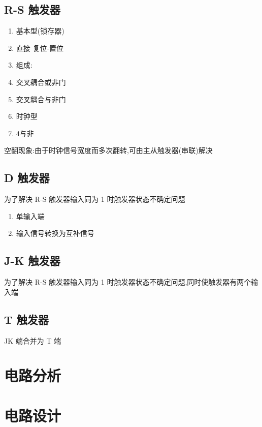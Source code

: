 
\subsection{R-S 触发器}

\begin{enumerate}
    \item 基本型(锁存器)
    \item 直接 复位-置位
    \item 组成:
    \item 交叉耦合或非门
    \item 交叉耦合与非门
    \item 时钟型
    \item 4\*与非
\end{enumerate}

空翻现象:由于时钟信号宽度而多次翻转,可由主从触发器(串联)解决

\newpage

\subsection{D 触发器}

为了解决 R-S 触发器输入同为 1 时触发器状态不确定问题

\begin{enumerate}
    \item 单输入端
    \item 输入信号转换为互补信号
\end{enumerate}

\subsection{J-K 触发器}

为了解决 R-S 触发器输入同为 1 时触发器状态不确定问题,同时使触发器有两个输入端

\subsection{T 触发器}

JK 端合并为 T 端

\newpage

\section{电路分析}

\section{电路设计}

\newpage
